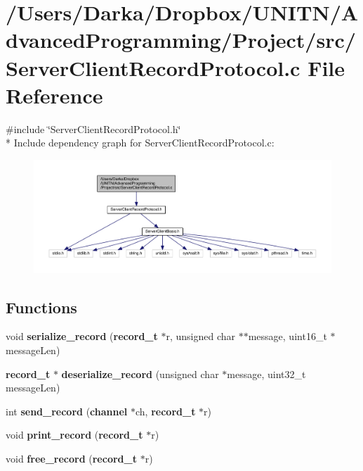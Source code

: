 \section{/\+Users/\+Darka/\+Dropbox/\+U\+N\+I\+T\+N/\+Advanced\+Programming/\+Project/src/\+Server\+Client\+Record\+Protocol.c File Reference}
\label{_server_client_record_protocol_8c}
{\ttfamily \#include \char`\"{}Server\+Client\+Record\+Protocol.\+h\char`\"{}}\\*
Include dependency graph for Server\+Client\+Record\+Protocol.\+c\+:\nopagebreak
\begin{figure}[H]
\begin{center}
\leavevmode
\includegraphics[width=350pt]{_server_client_record_protocol_8c__incl}
\end{center}
\end{figure}
\subsection*{Functions}
\begin{DoxyCompactItemize}
\item 
void {\bf serialize\+\_\+record} ({\bf record\+\_\+t} $\ast$r, unsigned char $\ast$$\ast$message, uint16\+\_\+t $\ast$message\+Len)
\item 
{\bf record\+\_\+t} $\ast$ {\bf deserialize\+\_\+record} (unsigned char $\ast$message, uint32\+\_\+t message\+Len)
\item 
int {\bf send\+\_\+record} ({\bf channel} $\ast$ch, {\bf record\+\_\+t} $\ast$r)
\item 
void {\bf print\+\_\+record} ({\bf record\+\_\+t} $\ast$r)
\item 
void {\bf free\+\_\+record} ({\bf record\+\_\+t} $\ast$r)
\end{DoxyCompactItemize}


